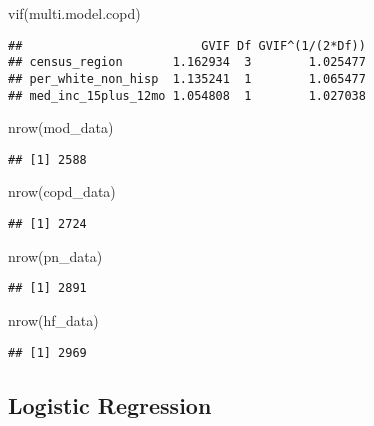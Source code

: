 \documentclass[
]{article}
\newenvironment{Shaded}{\begin{snugshade}}{\end{snugshade}}
\newcommand{\FunctionTok}[1]{\textcolor[rgb]{0.00,0.00,0.00}{#1}}
\newcommand{\NormalTok}[1]{#1}
\begin{document}
\begin{Shaded}
\begin{Highlighting}[]
\FunctionTok{vif}\NormalTok{(multi.model.copd)}
\end{Highlighting}
\end{Shaded}

\begin{verbatim}
##                         GVIF Df GVIF^(1/(2*Df))
## census_region       1.162934  3        1.025477
## per_white_non_hisp  1.135241  1        1.065477
## med_inc_15plus_12mo 1.054808  1        1.027038
\end{verbatim}

\begin{Shaded}
\begin{Highlighting}[]
\FunctionTok{nrow}\NormalTok{(mod\_data)}
\end{Highlighting}
\end{Shaded}

\begin{verbatim}
## [1] 2588
\end{verbatim}

\begin{Shaded}
\begin{Highlighting}[]
\FunctionTok{nrow}\NormalTok{(copd\_data)}
\end{Highlighting}
\end{Shaded}

\begin{verbatim}
## [1] 2724
\end{verbatim}

\begin{Shaded}
\begin{Highlighting}[]
\FunctionTok{nrow}\NormalTok{(pn\_data)}
\end{Highlighting}
\end{Shaded}

\begin{verbatim}
## [1] 2891
\end{verbatim}

\begin{Shaded}
\begin{Highlighting}[]
\FunctionTok{nrow}\NormalTok{(hf\_data)}
\end{Highlighting}
\end{Shaded}

\begin{verbatim}
## [1] 2969
\end{verbatim}

\hypertarget{logistic-regression}{%
\subsection{Logistic Regression}\label{logistic-regression}}
\end{document}
